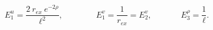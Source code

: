 \begin{equation}
E_{1}^{u}=\frac{2~r_{ex}~e^{-2\rho
}}{\ell^{2}},\,\,\,\,\,\,\,\,\,\,\,\,\,\,\,\,\,\,\,\,\,\,\,\,E_{1}^{v}=\frac{1}{r_{ex}}=E_{2}^{v},\,\,\,\,\,
\,\,\,\,\,\,\,\,\,\,\,\,\,\,\,\,E_{3}^{\rho}=\frac{1}{\ell}.
\label{17}
\end{equation}

